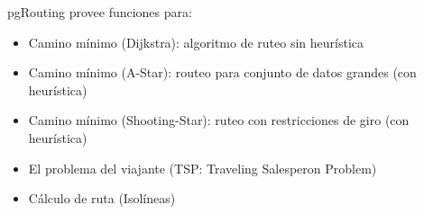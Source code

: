         pgRouting provee funciones para:
        \begin{itemize}
          \item Camino mínimo (Dijkstra): algoritmo de ruteo sin heurística
          \item Camino mínimo (A-Star): routeo para conjunto de datos grandes (con heurística)
          \item Camino mínimo (Shooting-Star): ruteo con restricciones de giro (con heurística)
          \item El problema del viajante (TSP: Traveling Salesperon Problem)
          \item Cálculo de ruta (Isolíneas)
        \end{itemize}

